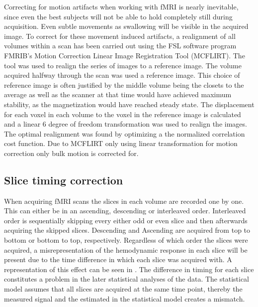 Correcting for motion artifacts when working with fMRI is nearly inevitable, since even the best subjects will not be able to hold completely still during acquisition. Even subtle movements as swallowing will be visible in the acquired image. \cite{Poldrack2011} To correct for these movement induced artifacts, a realignment of all volumes within a scan has been carried out using the FSL software program FMRIB's Motion Correction Linear Image Registration Tool (MCFLIRT). \cite{Jenkinson2002}
The tool was used to realign the series of images to a reference image. The volume acquired halfway through the scan was used a reference image. This choice of reference image is often justified by the middle volume being the closets to the average as well as the scanner at that time would have achieved maximum stability, as the magnetization would have reached steady state. \cite{Poldrack2011} The displacement for each voxel in each volume to the voxel in the reference image is calculated and a linear 6 degree of freedom transformation was used to realign the images. The optimal realignment was found by optimizing a the normalized correlation cost function. Due to MCFLIRT only using linear transformation for motion correction only bulk motion is corrected for. \cite{Jenkinson2002}


\subsection{Slice timing correction}

When acquiring fMRI scans the slices in each volume are recorded one by one. This can either be in an ascending, descending or interleaved order. Interleaved order is sequentially skipping every either odd or even slice and then afterwards acquiring the skipped slices. Descending and Ascending are acquired from top to bottom or bottom to top, respectively. Regardless of which order the slices were acquired, a misrepresentation of the hemodynamic response in each slice will be present due to the time difference in which each slice was acquired with. A representation of this effect can be seen in . The difference in timing for each slice constitutes a problem in the later statistical analyses of the data. The statistical model assumes that all slices are acquired at the same time point, thereby the measured signal and the estimated in the statistical model creates a mismatch. \cite{Poldrack2011} \\

